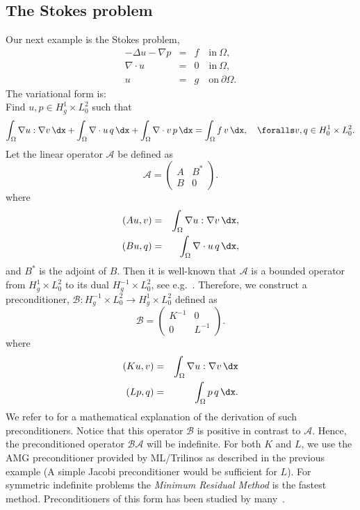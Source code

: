 \subsection{The Stokes problem}
Our next example is the Stokes problem, 
\begin{eqnarray}
-\Delta u - \nabla p &=& f \quad \mbox{in} \ \Omega, \\ 
\nabla \cdot u &=& 0 \quad \mbox{in} \  \Omega, \\
             u &=& g   \quad \mbox{on} \  \partial \Omega.  
\end{eqnarray}
The variational form is: \\ 
Find $u,p \in H^1_g \times L_0^2$ such that  
\[
\int_\Omega \nabla u : \nabla v \,  \dx + 
\int_\Omega \nabla \cdot u \, q \,  \dx +  
\int_\Omega \nabla \cdot v \, p \,  \dx = \int_\Omega f\, v\, \dx   , \quad
\foralls v,q \in H^1_0 \times L_0^2.
\]
Let the linear operator $\mathcal{A}$ be defined as
\[
\mathcal{A}  =
\begin{pmatrix} A & B^* \\ B & 0 \end{pmatrix}.
\]
where 
\begin{eqnarray}
(A u, v) &=& \int_\Omega \nabla u : \nabla v \,  \dx, \\  
(B u, q) &=& \int_\Omega \nabla \cdot u \, q \,  \dx,    
\end{eqnarray}
and $B^*$ is the adjoint of $B$.  
Then it is well-known that $\mathcal{A}$ is a bounded operator from
$H^1_g \times L_0^2$ to its dual $H_g^{-1} \times L_0^2$, see
e.g.~\citep{Brezzi1974,BrezziFortin1991}. Therefore, we 
construct a preconditioner, 
$\mathcal{B}: H_g^{-1} \times L_0^2 \rightarrow H^1_g \times L_0^2$
defined as 
\[
\mathcal{B} 
= 
\begin{pmatrix} K^{-1} & 0 \\ 0 & L^{-1} \end{pmatrix}.
\]
where 
\begin{eqnarray}
(K u, v) &=& \int_\Omega \nabla u: \nabla v \, \dx \\ 
(L p, q) &=& \int_\Omega p \, q \, \dx .   
\end{eqnarray}
We refer to \citep{MardalWinther11} for a mathematical explanation of the derivation 
of such preconditioners. 
Notice that this operator $\mathcal{B}$ is  positive in contrast to $\mathcal{A}$. Hence, 
the preconditioned operator $\mathcal{B} \mathcal{A}$ will be indefinite. For both 
$K$ and $L$, we use the AMG preconditioner provided by ML/Trilinos as
described in the previous example (A simple Jacobi preconditioner
would be sufficient for $L$).
For symmetric  indefinite problems the \emph{Minimum Residual Method} is
the fastest method. Preconditioners of this form has been studied by
many~\citep{ElmanSilvesterWathen2005,RustenWinther1992,SilvesterWathen1993,SilvesterWathen1994}. 

